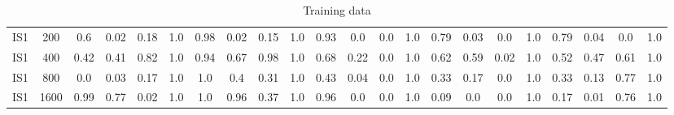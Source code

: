 \documentclass[10pt]{article}
\begin{document}
\begin{table}
\begin{tabular}{ cc||c c c c | c c c c | c c c c | c c c c| c c c c}
 					IS1 & 200 & 0.6 & 0.02 & 0.18 & 1.0 & 0.98 & 0.02 & 0.15 & 1.0& 0.93 & 0.0 & 0.0 & 1.0& 0.79 & 0.03 & 0.0 & 1.0 & 0.79 & 0.04 & 0.0 & 1.0\\ 
 					IS1 & 400 & 0.42 & 0.41 & 0.82 & 1.0 & 0.94 & 0.67 & 0.98 & 1.0& 0.68 & 0.22 & 0.0 & 1.0& 0.62 & 0.59 & 0.02 & 1.0 & 0.52 & 0.47 & 0.61 & 1.0\\ 
 					IS1 & 800 & 0.0 & 0.03 & 0.17 & 1.0 & 1.0 & 0.4 & 0.31 & 1.0& 0.43 & 0.04 & 0.0 & 1.0& 0.33 & 0.17 & 0.0 & 1.0 & 0.33 & 0.13 & 0.77 & 1.0\\ 
 					IS1 & 1600 & 0.99 & 0.77 & 0.02 & 1.0 & 1.0 & 0.96 & 0.37 & 1.0& 0.96 & 0.0 & 0.0 & 1.0& 0.09 & 0.0 & 0.0 & 1.0 & 0.17 & 0.01 & 0.76 & 1.0\\ \hline
 \hline
  \end{tabular}
  \caption{Training data}
\end{table}
\end{document}
